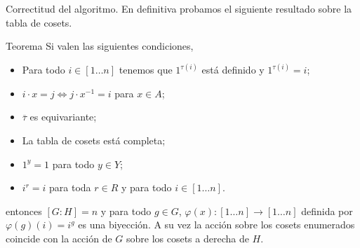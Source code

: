 \documentclass[aspectratio=169, 9pt]{beamer}
\renewcommand\qedsymbol{\textcolor{orange}{$\blacksquare$}}
\newcommand{\In}{[1 \dots n]}
\newcommand{\ol}{\overline}
\begin{document}
\begin{frame}[fragile]{Correctitud del algoritmo.}
	En definitiva probamos el siguiente resultado sobre la tabla de cosets.
	
	\begin{alertblock}{Teorema}
		Si valen las siguientes condiciones,
		\begin{itemize}
			\item Para todo $i \in \In$ tenemos que $1^{\tau(i)}$ está definido y $1^{\tau(i)} = i$;
			\item $i \cdot x = j \iff j \cdot x^{-1} = i$ para $x \in A$;
			\item $\ol \tau$ es equivariante;
			\item La tabla de cosets está completa;
			\item $1^y = 1$ para todo $y \in Y$;
			\item $i^r  = i$ para toda $r \in R$ y para todo $i \in \In$.
		\end{itemize}
		\pause
		entonces $[G:H] = n$ y para todo $g \in G$, $\varphi(x): \In \to \In$ definida por $\varphi(g)(i) = i^g$ es una biyección.
		A su vez la acción sobre los cosets enumerados coincide con la acción de $G$ sobre los cosets a derecha de $H$.
	\end{alertblock}
	\medskip
\end{frame}

%	
%			
%		
\end{document}
